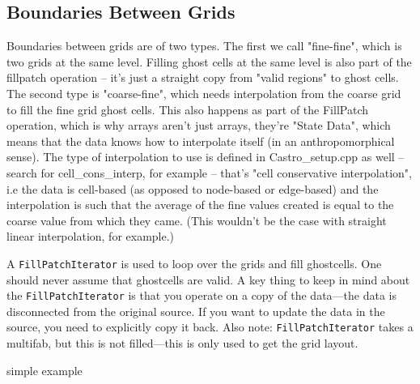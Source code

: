 \subsection{Boundaries Between Grids}
Boundaries between grids are of two types. The first we call
"fine-fine", which is two grids at the same level.  Filling ghost
cells at the same level is also part of the fillpatch operation --
it's just a straight copy from "valid regions" to ghost cells. The
second type is "coarse-fine", which needs interpolation from the
coarse grid to fill the fine grid ghost cells.  This also happens as
part of the FillPatch operation, which is why arrays aren't just
arrays, they're "State Data", which means that the data knows how to
interpolate itself (in an anthropomorphical sense).  The type of
interpolation to use is defined in Castro\_setup.cpp as well -- search
for cell\_cons\_interp, for example -- that's "cell conservative
interpolation", i.e the data is cell-based (as opposed to node-based
or edge-based) and the interpolation is such that the average of the
fine values created is equal to the coarse value from which they came.
(This wouldn't be the case with straight linear interpolation, for
example.)

A {\tt FillPatchIterator} is used to loop over the grids and fill
ghostcells.  One should never assume that ghostcells are valid.  A key
thing to keep in mind about the {\tt FillPatchIterator} is that you
operate on a copy of the data---the data is disconnected from the
original source.  If you want to update the data in the source,
you need to explicitly copy it back.  Also note: {\tt FillPatchIterator}
takes a multifab, but this is not filled---this is only used to
get the grid layout.   

{\color{red}simple example}


